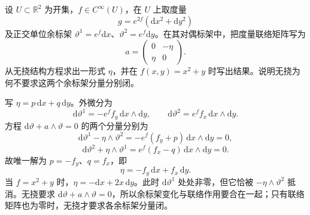 \begin{exercise}
	\label{g1:ex:conformal-coframe-torsion-correction}
	设 \(U\subset\mathbb R^2\) 为开集，\(f\in C^\infty(U)\)，在 \(U\) 上取度量
	\[
		g=e^{2f}(\mathrm{d}x^2+\mathrm{d}y^2)
	\]
	及正交单位余标架 \(\vartheta^1=e^f\mathrm{d}x\)、\(\vartheta^2=e^f\mathrm{d}y\)。在其对偶标架中，把度量联络矩阵写为
	\[
		a=\begin{pmatrix}0&-\eta\\\eta&0\end{pmatrix}.
	\]
	从无挠结构方程求出一形式 \(\eta\)，并在 \(f(x,y)=x^2+y\) 时写出结果。说明无挠为何不要求这两个余标架分量分别闭。
\end{exercise}
\begin{solution}
	写 \(\eta=p\,\mathrm{d}x+q\,\mathrm{d}y\)。外微分为
	\[
		\mathrm{d}\vartheta^1=-e^ff_y\,\mathrm{d}x\wedge\mathrm{d}y,
		\qquad
		\mathrm{d}\vartheta^2=e^ff_x\,\mathrm{d}x\wedge\mathrm{d}y.
	\]
	方程 \(\mathrm{d}\vartheta+a\wedge\vartheta=0\) 的两个分量分别为
	\[
		\mathrm{d}\vartheta^1-\eta\wedge\vartheta^2
		=-e^f(f_y+p)\,\mathrm{d}x\wedge\mathrm{d}y=0,
	\]
	\[
		\mathrm{d}\vartheta^2+\eta\wedge\vartheta^1
		=e^f(f_x-q)\,\mathrm{d}x\wedge\mathrm{d}y=0.
	\]
	故唯一解为 \(p=-f_y\)、\(q=f_x\)，即
	\[
		\eta=-f_y\,\mathrm{d}x+f_x\,\mathrm{d}y.
	\]
	当 \(f=x^2+y\) 时，\(\eta=-\mathrm{d}x+2x\,\mathrm{d}y\)。此时 \(\mathrm{d}\vartheta^1\) 处处非零，但它恰被 \(-\eta\wedge\vartheta^2\) 抵消。无挠要求 \(\mathrm{d}\vartheta+a\wedge\vartheta=0\)，所以余标架变化与联络作用要合在一起；只有联络矩阵也为零时，无挠才要求各余标架分量闭。
\end{solution}

